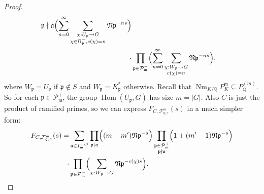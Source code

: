 \documentclass{amsart}
\numberwithin{equation}{section}
\theoremstyle{plain}
\theoremstyle{definition}
\theoremstyle{remark}
\begin{document}
\begin{proof}
\begin{equation*}
\begin{aligned}
{{					\mathfrak{p}\nmid\mathfrak{a}
				}
			}\Bigl(
			\sum_{n=0}^{\infty}
			\sum_{
				\substack{
					\chi:U_{\mathfrak{p}}\to G\\
					\chi\in\Omega^{-}_{\mathfrak{p}},c(\chi)=n					
				}
			}
			\mathfrak{Np}^{-ns}
			\Bigr)
			\\
			\cdot&\prod_{\mathfrak{p}\in\mathcal{P}_{\mathfrak{m}}^-}
			\Bigl(
			\sum_{n=0}^\infty
			\sum_{
				\substack{
					\chi:W_{\mathfrak{p}}\to G\\
					c(\chi)=n
				}
			}\mathfrak{Np}^{-ns}
			\Bigr)
			,
		\end{aligned}		
	\end{equation*}
	where $W_{\mathfrak{p}}=U_{\mathfrak{p}}$ if $\mathfrak{p}\notin S$ and $W_{\mathfrak{p}}=K_{\mathfrak{p}}^*$ otherwise.
	Recall that $\operatorname{Nm}_{K/\mathbb{Q}}P_K^{\mathfrak{m}}\subseteq P_{\mathbb{Q}}^{(m)}$.
	So for each $\mathfrak{p}\in\mathcal{P}_{\mathfrak{m}}^+$, the group $\operatorname{Hom}(U_{\mathfrak{p}},G)$ has size $m=\lvert G\rvert$.
	Also $C$ is just the product of ramified primes, so we can express $F_{C,\mathcal{F}_{q,\gamma}^{\mathfrak{m}}}(s)$ in a much simpler form:
	\begin{equation}\label{eqn: field-counting of abelian extensions in general 1}
		\begin{aligned}
			F_{C,\mathcal{F}_{q,\gamma}^{\mathfrak{m}}}(s)=
			&\sum_{\mathfrak{a}\in I^{+,\mu}_{\mathfrak{m}}}
			\prod_{\mathfrak{p}\mid\mathfrak{a}}\Bigl(
			(m-m')\mathfrak{Np}^{-s}			
			\Bigr)
			\prod_{
				\substack{
					\mathfrak{p}\in\mathcal{P}_{\mathfrak{m}}^+\\
					\mathfrak{p}\nmid\mathfrak{a}
				}
			}\Bigl(
			1+(m'-1)\mathfrak{Np}^{-s}
			\Bigr)
			\\
			\cdot&\prod_{\mathfrak{p}\in\mathcal{P}_{\mathfrak{m}}^-}
			\Bigl(
			\sum_{\chi:W_{\mathfrak{p}}\to G}\mathfrak{Np}^{-c(\chi)s}
			\Bigr).
		\end{aligned}		
	\end{equation}
	

\end{proof}
\end{document}
